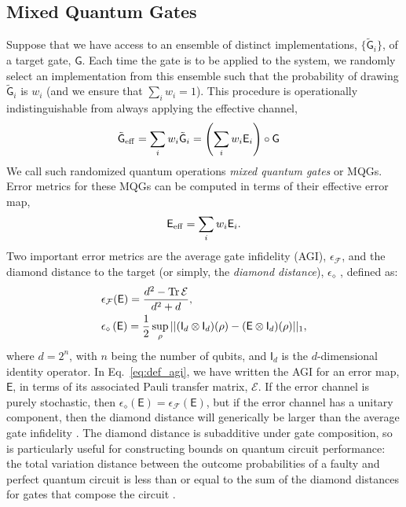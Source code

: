 \documentclass[aps,nofootinbib,pra,notitlepage,twocolumn]{revtex4-1}
\newcommand{\tr}{{\rm Tr\thinspace}}
\newcommand{\actual}{\ensuremath{\tilde{\mathsf{G}}}}
\newcommand{\target}{\ensuremath{{\mathsf{G}}}}
\newcommand{\error}{\ensuremath{{\mathsf{E}}}}
\newcommand{\errmat}{\ensuremath{{\mathcal{E}}}}
\newcommand{\AGI}{\ensuremath{\epsilon_\mathcal{F}}}
\newcommand{\dnorm}{\ensuremath{\epsilon_\diamond}}
\newcommand{\ident}{\ensuremath{\mathsf{I}}}
\newcommand{\0}{\ensuremath{\mathbf{0}}}
\newcommand{\weight}{\ensuremath{w}}
\begin{document}
\subsection{Mixed Quantum Gates}
\label{sec:mqg}
\noindent Suppose that we have access to an ensemble of distinct implementations, 
$\{\actual_i\}$, of a target gate, $\target$.
Each time the gate is to be applied to the system, we randomly select an implementation from this ensemble such that the probability of drawing $\actual_i$ is $\weight_i$ (and we ensure that $\sum_i \weight_i=1$). This procedure is operationally indistinguishable from always applying the effective channel, 
\begin{align}
	\actual_{\rm eff} &= \sum_i \weight_i \actual_i = \left(\sum_i \weight_i \error_i \right) \circ\target
\end{align}
We call such randomized quantum operations \emph{mixed quantum gates} or MQGs. Error metrics for these MQGs can be computed in terms of their effective error map, 
\begin{equation}
	\label{eq:effective_error}
	\error_{\rm eff} = \sum_i \weight_i \error_i.
\end{equation}
Two important error metrics are the average gate infidelity (AGI), $\AGI$\cite{Johnston2011}, and the diamond distance to the target (or simply, the \emph{diamond distance}), $\dnorm$ \cite{watrous2018theory}, defined as:
\begin{align}
	\label{eq:def_agi}
	&\AGI(\error) = \frac{d^2 - \tr{\errmat}}{d^2 + d},\\
	\label{eq:def_diamond}
	&\dnorm \left(\error\right)
		= \frac{1}{2} \sup_\rho \vert \vert (\ident_d\otimes \ident_d)(\rho) 
										  - (\error \otimes \ident_d)(\rho) \vert\vert_1,
\end{align}
where $d=2^n$, with $n$ being the number of qubits, and $\ident_d$ is the $d$-dimensional identity operator.  In Eq.~\eqref{eq:def_agi}, we have written the AGI for an error map, $\error$, in terms of its associated Pauli transfer matrix, $\errmat$. If the error channel is purely stochastic, then $\dnorm(\error) = \AGI(\error)$, but if the error channel has a unitary component, then the diamond distance will generically be larger than the average gate infidelity \cite{1511.00727}. The diamond distance is subadditive \cite{watrous2018theory} under gate composition, so is particularly useful for constructing bounds on quantum circuit performance: the total variation distance between the outcome probabilities of a faulty and perfect quantum circuit is less than or equal to the sum of the diamond distances for gates that compose the circuit \cite{aharonov1998quantum}.
\end{document}
